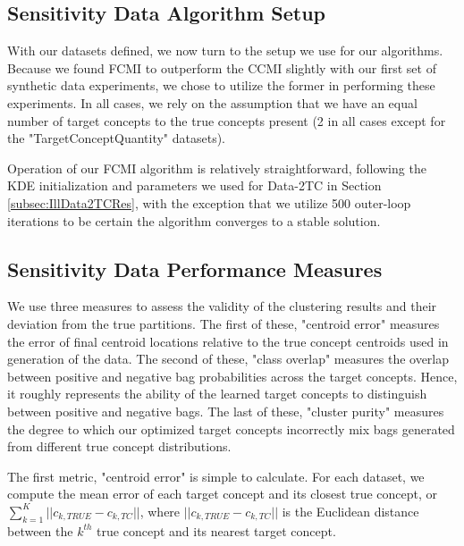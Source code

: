 \documentclass[12pt,dvips]{report}
\numberwithin{equation}{section}
\begin{document}
\subsection{Sensitivity Data Algorithm Setup} \label{subsec:ParameterSynthSetup}

With our datasets defined, we now turn to the setup we use for our algorithms.  Because we found FCMI to outperform the CCMI slightly with our first set of synthetic data experiments, we chose to utilize the former in performing these experiments.  In all cases, we rely on the assumption that we have an equal number of target concepts to the true concepts present (2 in all cases except for the "TargetConceptQuantity" datasets).%

Operation of our FCMI algorithm is relatively straightforward, following the KDE initialization and parameters we used for Data-2TC in Section \ref{subsec:IllData2TCRes}, with the exception that we utilize 500 outer-loop iterations to be certain the algorithm converges to a stable solution.  

\subsection{Sensitivity Data Performance Measures} \label{subsec:ParameterSynthPerfMeasures}

We use three measures to assess the validity of the clustering results and their deviation from the true partitions.  The first of these, "centroid error" measures the error of final centroid locations relative to the true concept centroids used in generation of the data.  The second of these, "class overlap" measures the overlap between positive and negative bag probabilities across the target concepts.  Hence, it roughly represents the ability of the learned target concepts to distinguish between positive and negative bags.  The last of these, "cluster purity" measures the degree to which our optimized target concepts incorrectly mix bags generated from different true concept distributions.  

The first metric, "centroid error" is simple to calculate.  For each dataset, we compute the mean error of each target concept and its closest true concept, or $\sum_{k=1}^{K} \vert \vert c_{k,TRUE}-c_{k,TC}\vert \vert $, where $\vert \vert c_{k,TRUE}-c_{k,TC}\vert \vert $ is the Euclidean distance between the $k^{th}$ true concept and its nearest target concept.
\end{document}
